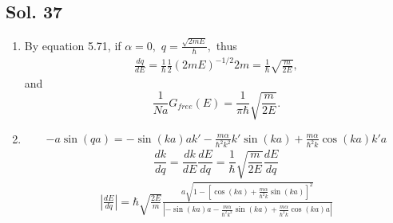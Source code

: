    \subsection*{Sol. 37}
   \begin{enumerate}
       \item 
       By equation 5.71, if $\alpha=0,$ $q=\frac{\sqrt{2mE}}{\hbar},$ thus
       \begin{align*}
           \frac{dq}{dE} = \frac{1}{\hbar}\frac{1}{2}(2mE)^{-1/2}2m
           =\frac{1}{\hbar}\sqrt{\frac{m}{2E}},
       \end{align*}
       and 
       $$
       \frac{1}{Na}G_{free}(E)
       =\frac{1}{\pi\hbar}\sqrt{\frac{m}{2E}}.
       $$
       \item 
       \begin{align*}
           -a\sin(qa)
           =-\sin(ka)ak'
           -\frac{m\alpha}{\hbar^2 k^2}k'
           \sin(ka)
           +\frac{m\alpha}{\hbar^2 k}\cos(ka)k'a
       \end{align*}
       $$
       \frac{dk}{dq} = \frac{dk}{dE}\frac{dE}{dq} = \frac{1}{\hbar}\sqrt{\frac{m}{2E}}\frac{dE}{dq}
       $$
       \begin{align*}
           \left|\frac{dE}{dq}\right| = 
           \hbar\sqrt{\frac{2E}{m}}
           \frac{a\sqrt{1-\left[\cos(ka)+\frac{m\alpha}{\hbar^2k}\sin(ka)\right]^2}}
           {|-\sin(ka)a-\frac{m\alpha}{\hbar^2k^2}\sin(ka)+\frac{m\alpha}{\hbar^2k}\cos(ka)a|}
       \end{align*}
   \end{enumerate}
